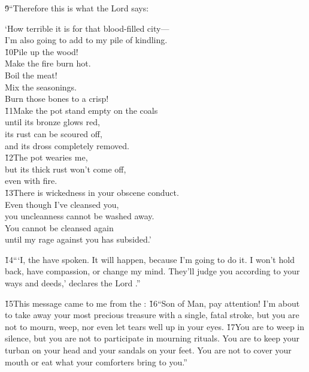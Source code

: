 \v{9}``Therefore this is what the Lord  says:

\begin{poetry}
\poeml `How terrible it is for that blood-filled city--- \\
\poemll    I'm also going to add to my pile of kindling. \\
\poeml \v{10}Pile up the wood! \\
\poemll    Make the fire burn hot. \\
\poeml Boil the meat! \\
\poemll    Mix the seasonings. \\
\poeml Burn those bones to a crisp! \\
\poeml \v{11}Make the pot stand empty on the coals \\
\poemll    until its bronze glows red, \\
\poeml its rust can be scoured off, \\
\poemll    and its dross completely removed. \\
\poeml \v{12}The pot wearies me, \\
\poemll    but its thick rust won't come off, \\
\poemlll       even with fire. \\
\poeml \v{13}There is wickedness in your obscene conduct. \\
\poemll    Even though I've cleansed you, \\
\poemlll       you uncleanness cannot be washed away. \\
\poeml You cannot be cleansed again \\
\poemll    until my rage against you has subsided.'
\end{poetry}

\v{14}```I, the  have spoken. It will happen, because I'm going to do it. I won't hold back, have compassion, or change my mind. They'll judge you according to your ways and deeds,' declares the Lord .''

\v{15}This message came to me from the : \v{16}``Son of Man, pay attention! I'm about to take away your most precious treasure with a single, fatal stroke, but you are not to mourn, weep, nor even let tears well up in your eyes. \v{17}You are to weep in silence, but you are not to participate in mourning rituals. You are to keep your turban on your head and your sandals on your feet. You are not to cover your mouth or eat what your comforters bring to you.''

